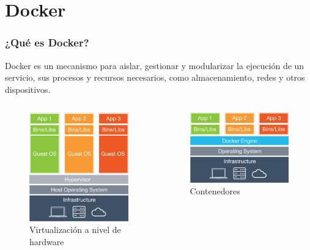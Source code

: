 \documentclass[xcolor=dvipsnames]{beamer}
\begin{document}
\section{Docker}
\begin{frame}[fragile]
	\frametitle{¿Qué es Docker?}
	Docker es un mecanismo para aislar, gestionar y modularizar la ejecución de un servicio, sus procesos y recursos necesarios, como almacenamiento, redes y otros dispositivos.

		\begin{columns}[c]
			\begin{column}[t]{5cm}
				\begin{figure}
					\begin{center}
\centering
\includegraphics[width=0.7\linewidth]{./what-is-docker-diagram}
\caption{Virtualización a nivel de hardware}
\label{fig:what-is-docker-diagram}
					\end{center}
				\end{figure}
			\end{column}
			\begin{column}[t]{5cm}
				\begin{figure}[b]
					\vskip 1.35cm
					\begin{center}
\includegraphics[width=0.7\linewidth]{./what-is-vm-diagram}
\caption{Contenedores}
\label{fig:what-is-vm-diagram}
					\end{center}
				\end{figure}
			\end{column}
		\end{columns}

\end{frame}
\end{document}
